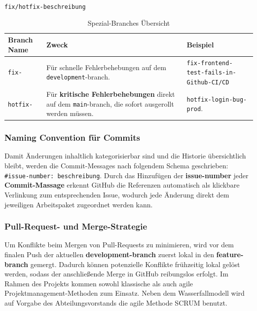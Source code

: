 \texttt{fix/hotfix-\textlangle beschreibung\textrangle}
\begin{table}[h]
\centering
\small
\begin{tabular}{|p{}|p{}|p{}|}
\hline
\textbf{Branch Name} & \textbf{Zweck} & \textbf{Beispiel} \\
\hline
\texttt{fix-} &
Für schnelle Fehlerbehebungen auf dem \texttt{development}-branch. &
\texttt{fix-frontend-test-fails-in-} \texttt{Github-\gls{CI/CD}} \\
\hline
\texttt{hotfix-} &
Für \textbf{kritische Fehlerbehebungen} direkt auf dem \texttt{main}-branch,
die sofort ausgerollt werden müssen. &
\texttt{hotfix-login-bug-prod}. \\
\hline
\end{tabular}
\caption{Spezial-Branches Übersicht}
\label{tab:spezial-branches}
\end{table}
\subsubsection{Naming Convention für Commits}
Damit Änderungen inhaltlich kategorisierbar sind und die Historie übersichtlich bleibt, werden die Commit-Messages nach folgendem Schema geschrieben:\\ \texttt{\#issue-number: \textlangle beschreibung\textrangle}.\newline
Durch das Hinzufügen der \textbf{issue-number} jeder \textbf{Commit-Massage} erkennt GitHub die Referenzen automatisch als klickbare Verlinkung\cite{github_autolinked_references} zum entsprechenden Issue, wodurch jede Änderung direkt dem jeweiligen Arbeitspaket zugeordnet werden kann.
\subsubsection{Pull-Request- und Merge-Strategie}
Um Konflikte beim Mergen von Pull-Requests zu minimieren, wird vor dem finalen Push der aktuellen \textbf{development-branch} zuerst lokal in den \textbf{feature-branch} gemergt\cite{git_branching_merging_chacon2014progit}.  Dadurch können potenzielle Konflikte frühzeitig lokal gelöst werden, sodass der anschließende Merge in GitHub reibungslos erfolgt.
Im Rahmen des Projekts kommen sowohl klassische als auch agile Projektmanagement-Methoden zum Einsatz. Neben dem Wasserfallmodell wird auf Vorgabe des Abteilungsvorstands die agile Methode \gls{SCRUM}\cite{schwaber2020scrum} benutzt.

